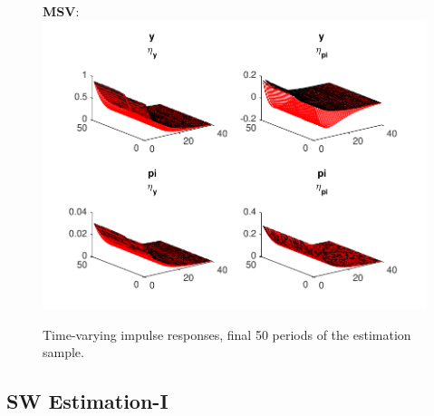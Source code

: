 \documentclass[12pt,reqno]{article}
\numberwithin{equation}{section}
\begin{document}
\begin{figure}[H]
\caption{Time-varying impulse responses, final 50 periods of the estimation sample.}

\textbf{MSV}: \\
\includegraphics[scale=1]{NKPC_ree_init_MSV_IR_timeVarying.pdf}\\
\end{figure}


\subsection*{SW Estimation-I}
\end{document}
